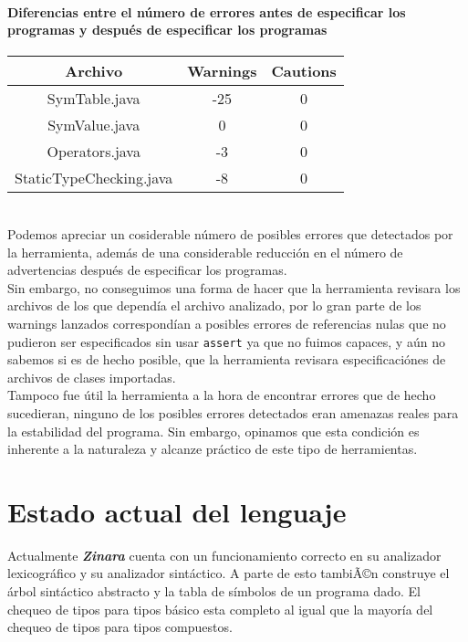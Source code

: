 \documentclass[12pt, spanish]{report}
\begin{document}
\subsubsection{Diferencias entre el n\'umero de errores antes de especificar
   los programas y despu\'es de especificar los programas}
\begin{tabular}{|c||cc|}
\hline
Archivo                 & Warnings & Cautions  \\
\hline \hline
SymTable.java           & -25 & 0 \\
SymValue.java           & 0   & 0 \\
Operators.java          & -3  & 0 \\
StaticTypeChecking.java & -8  & 0 \\
	\hline
\end{tabular}\\

Podemos apreciar un cosiderable n\'umero de posibles errores que
detectados por la herramienta, adem\'as de una considerable 
reducci\'on en el n\'umero de advertencias despu\'es de especificar los
programas.\\
\indent Sin embargo, no conseguimos una forma de hacer que la
herramienta revisara los archivos de los que depend\'ia el archivo
analizado, por lo gran parte de los warnings lanzados correspond\'ian a
posibles errores de referencias nulas que no pudieron ser
especificados sin usar \texttt{assert} ya que no fuimos
capaces, y a\'un no sabemos si es de hecho posible, que la herramienta
revisara especificaci\'ones de archivos de clases importadas.\\
\indent Tampoco fue \'util la herramienta a la hora de encontrar errores
que de hecho sucedieran, ninguno de los posibles errores detectados eran
amenazas reales para la estabilidad del programa. Sin embargo, opinamos
que esta condici\'on es inherente a la naturaleza y alcanze pr\'actico
de este tipo de herramientas. 


\chapter{Estado actual del lenguaje}
\label{chap:estado}

Actualmente \emph{\textbf{Zinara}} cuenta con un funcionamiento
correcto en su analizador lexicogr\'afico y su analizador sint\'actico. A
parte de esto tambiÃ©n construye el \'arbol sint\'actico abstracto y la
tabla de s\'imbolos de un programa dado. El chequeo de tipos para tipos
b\'asico esta completo al igual que la mayor\'ia del chequeo de tipos
para tipos compuestos.



\end{document}
